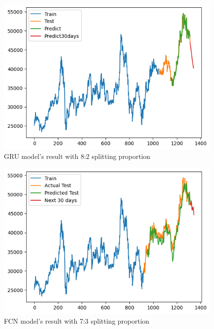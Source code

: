 \documentclass{ieeeojies}
\begin{document}
\begin{figure}[H]
  \centering
  \begin{minipage}{0.6\linewidth}
    \centering
    \includegraphics[width=\linewidth]{bibliography/diagram/GRU-BIDV.png}
    \caption{GRU model’s result with 8:2 splitting proportion}
    \label{fig8}
  \end{minipage}
\end{figure}

\begin{figure}[H]
  \centering
  \begin{minipage}{0.6\linewidth}
    \centering
    \includegraphics[width=\linewidth]{bibliography/diagram/FCN-BID.png}
    \caption{FCN model’s result with 7:3 splitting proportion}
    \label{fig8}
  \end{minipage}
\end{figure}
\end{document}
